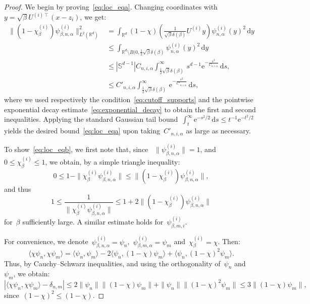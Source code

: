 \documentclass[10pt]{article}
\renewcommand{\d}{\mathrm{d}}
\newcommand{\e}{\mathrm{e}}
\newcommand{\R}{\mathbb{R}}
\newcommand{\1}{\mathbbm 1}
\newcommand{\largeRadius}{\delta}
\begin{document}
    \begin{proof}
        We begin by proving~\eqref{eq:loc_eqa}.
        Changing coordinates with~$y = \sqrt\beta U^{(i)\intercal}(x-z_i)$, we get:
        \begin{equation}
            \begin{aligned}
                \|(1-\chi_\beta^{(i)})\psi_{\beta,n,\alpha}^{(i)}\|^2_{L^2(\R^d)} &= \int_{\R^d}\left(1-\chi\right)\left(\frac1{\sqrt\beta\largeRadius(\beta)}U^{(i)}y\right)\psi^{(i)}_{n,\alpha}(y)^2\,\d y\\
                &\leq \int_{\R^d\setminus B(0,\frac12 \sqrt\beta\largeRadius(\beta)}\psi^{(i)}_{n,\alpha}(y)^2\,\d y\\
                &\leq |\mathbb S^{d-1}|C_{n,i,\alpha}\int_{\frac12 \sqrt\beta\largeRadius(\beta)}^\infty\,s^{d-1}\e^{-\frac{s^2}{C_{n,i,\alpha}}}\,\d s,\\
                &\leq C'_{n,i,\alpha}\int_{\frac12 \sqrt\beta\largeRadius(\beta)}^\infty\,\e^{-\frac{s^2}{C'_{n,i,\alpha}}}\,\d s,
            \end{aligned}
        \end{equation}
        where we used respectively the condition~\eqref{eq:cutoff_supports} and the pointwise exponential decay estimate~\eqref{eq:exponential_decay} to obtain the first and second inequalities. Applying the standard Gaussian tail bound~$\int_t^\infty \e^{-s^2/2}\,\d s \leq t^{-1}\e^{-t^2/2}$ yields the desired bound~\eqref{eq:loc_eqa} upon taking~$C'_{n,i,\alpha}$ as large as necessary.

        To show~\eqref{eq:loc_eqb}, we first note that, since
       ~$\|\psi^{(i)}_{\beta,n,\alpha}\| =1$, and~$0\leq \chi_\beta^{(i)}\leq 1$, we obtain, by a simple triangle inequality:
        \[0\leq 1-\|\chi_\beta^{(i)}\psi^{(i)}_{\beta,n,\alpha}\|\leq \|(1-\chi_\beta^{(i)})\psi^{(i)}_{\beta,n,\alpha}\|,\]
        and thus
        \begin{equation}
            \label{eq:lemme2_normalization}
            1\leq \frac1{\|\chi_\beta^{(i)}\psi^{(i)}_{\beta,n,\alpha}\|} \leq 1 + 2\|(1-\chi_\beta^{(i)})\psi^{(i)}_{\beta,n,\alpha}\|
        \end{equation}
        for~$\beta$ sufficiently large. A similar estimate holds for~$\psi^{(i)}_{\beta,m,i}$.

        For convenience, we denote~$\psi^{(i)}_{\beta,n,\alpha} = \psi_n$,~$\psi^{(i)}_{\beta,m,\alpha}=\psi_m$ and~$\chi_\beta^{(i)}=\chi$. Then:
        \[\langle \chi \psi_n,\chi \psi_m\rangle = \langle \psi_n,\psi_m\rangle - 2\langle \psi_n,(1-\chi)\psi_m\rangle + \langle\psi_n,(1-\chi)^2\psi_m\rangle.\]
        Thus, by Cauchy--Schwarz inequalities, and using the orthogonality of~$\psi_n$ and~$\psi_m$, we obtain:
       \[ \left|\langle \chi\psi_n,\chi\psi_m\rangle - \delta_{n,m}\right| \leq 2 \|\psi_n\|\|(1-\chi)\psi_m\| + \|\psi_n\|\|(1-\chi)^2\psi_m\| \leq 3\|(1-\chi)\psi_m\|,\]
       since~$(1-\chi)^2\leq (1-\chi)$.
        

\end{proof}
\end{document}
